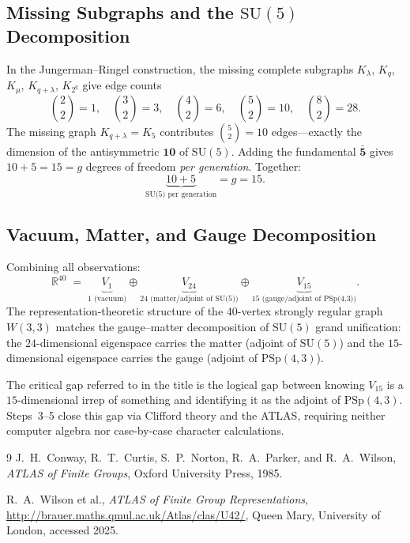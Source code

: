 \subsection{Missing Subgraphs and the $\mathrm{SU}(5)$ Decomposition}

In the Jungerman--Ringel construction, the missing complete subgraphs
$K_\lambda$, $K_q$, $K_\mu$, $K_{q+\lambda}$, $K_{2^q}$
give edge counts
\[
  \binom{2}{2} = 1,\quad
  \binom{3}{2} = 3,\quad
  \binom{4}{2} = 6,\quad
  \binom{5}{2} = 10,\quad
  \binom{8}{2} = 28.
\]
The missing graph $K_{q+\lambda} = K_5$ contributes $\binom{5}{2} = 10$
edges---exactly the dimension of the antisymmetric $\mathbf{10}$ of $\mathrm{SU}(5)$.
Adding the fundamental $\mathbf{\bar{5}}$ gives $10 + 5 = 15 = g$ degrees of freedom
\emph{per generation}.  Together:
\[
  \underbrace{10 + 5}_{\text{SU(5) per generation}} = g = 15.
\]

\subsection{Vacuum, Matter, and Gauge Decomposition}

Combining all observations:
\[
  \mathbb{R}^{40}
  \;=\;
  \underbrace{V_1}_{1\text{ (vacuum)}}
  \oplus
  \underbrace{V_{24}}_{24\text{ (matter/adjoint of SU(5))}}
  \oplus
  \underbrace{V_{15}}_{15\text{ (gauge/adjoint of PSp(4,3))}}.
\]
The representation-theoretic structure of the $40$-vertex strongly regular graph
$W(3,3)$ matches the gauge--matter decomposition of $\mathrm{SU}(5)$ grand unification:
the $24$-dimensional eigenspace carries the matter (adjoint of $\mathrm{SU}(5)$) and the
$15$-dimensional eigenspace carries the gauge (adjoint of $\mathrm{PSp}(4,3)$).

\begin{remark}
The critical gap referred to in the title is the logical gap between knowing
$V_{15}$ is a $15$-dimensional irrep of something and identifying it as the adjoint
of $\mathrm{PSp}(4,3)$.  Steps~3--5 close this gap via Clifford theory and the ATLAS,
requiring neither computer algebra nor case-by-case character calculations.
\end{remark}

\begin{thebibliography}{9}
  J.~H.~Conway, R.~T.~Curtis, S.~P.~Norton, R.~A.~Parker, and R.~A.~Wilson,
  \textit{ATLAS of Finite Groups},
  Oxford University Press, 1985.

  R.~A.~Wilson et al.,
  \textit{ATLAS of Finite Group Representations},
  \url{http://brauer.maths.qmul.ac.uk/Atlas/clas/U42/},
  Queen Mary, University of London, accessed 2025.
\end{thebibliography}
